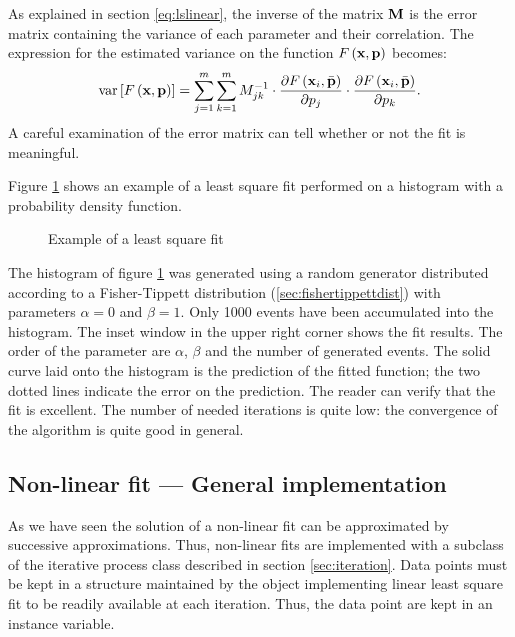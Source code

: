 \documentclass[twoside]{book}
\begin{document}
As explained in section \ref{eq:lslinear}, the inverse of the
matrix ${\bf M}$ is the error matrix containing the variance of
each parameter and their correlation. The expression for the
estimated variance on the function $F\left({\bf x},{\bf p}\right)$
becomes:
\begin{equation}
\label{eq:nllserror}
  \mathop{\rm var}\left[F\left({\bf x},{\bf p}\right)\right]=
  \sum_{j=1}^m\sum_{k=1}^m M_{jk}^{-1}\cdot
  {\displaystyle\partial F\left({\bf x}_i,\bar{\bf
p}\right)\over\displaystyle\partial
p_j}\cdot{\displaystyle\partial F\left({\bf x}_i,\bar{\bf
p}\right)\over\displaystyle\partial p_k}.
\end{equation}
A careful examination of the error matrix can tell whether or not
the fit is meaningful.

Figure \ref{fig:lsfExample} shows an example of a least square fit
performed on a histogram with a probability density function.
\begin{figure}
\center{}
\caption{Example of a least square fit}\label{fig:lsfExample}
\end{figure}
The histogram of figure \ref{fig:lsfExample} was generated using a
random generator distributed according to a Fisher-Tippett
distribution (\cf \ref{sec:fishertippettdist}) with parameters
$\alpha = 0$ and $\beta=1$. Only 1000 events have been accumulated
into the histogram. The inset window in the upper right corner
shows the fit results. The order of the parameter are $\alpha$,
$\beta$ and the number of generated events. The solid curve laid
onto the histogram is the prediction of the fitted function; the
two dotted lines indicate the error on the prediction. The reader
can verify that the fit is excellent. The number of needed
iterations is quite low: the convergence of the algorithm is quite
good in general.

\subsection{Non-linear fit --- General implementation}
 As we have seen the solution of a
non-linear fit can be approximated by successive approximations.
Thus, non-linear fits are implemented with a subclass of the
iterative process class described in section \ref{sec:iteration}.
Data points must be kept in a structure maintained by the object
implementing linear least square fit to be readily available at
each iteration. Thus, the data point are kept in an instance
variable.
\end{document}
